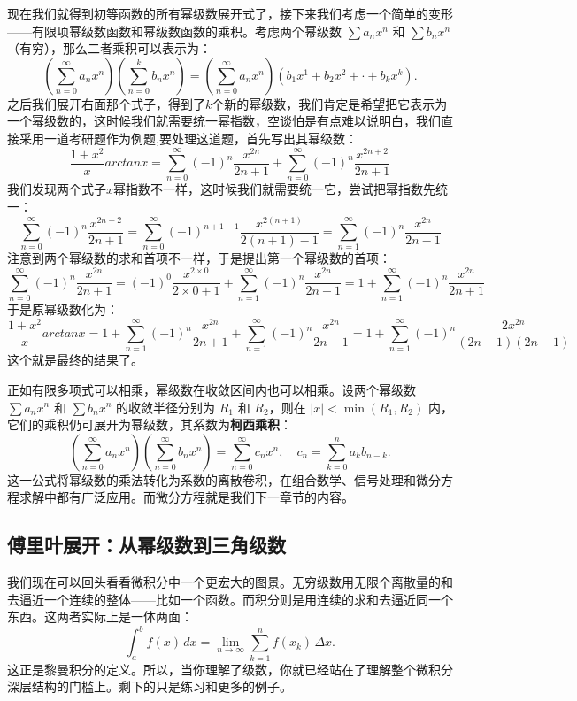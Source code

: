 \documentclass[UTF8]{ctexbook}
\begin{document}
现在我们就得到初等函数的所有幂级数展开式了，接下来我们考虑一个简单的变形——有限项幂级数函数和幂级数函数的乘积。考虑两个幂级数 $\sum a_n x^n$ 和 $\sum b_n x^n$（有穷），那么二者乘积可以表示为：
\[
\left( \sum_{n=0}^{\infty} a_n x^n \right) \left( \sum_{n=0}^{k} b_n x^n \right) = \left( \sum_{n=0}^{\infty} a_n x^n \right) \left( b_1x^1+b_2x^2+\cdot+b_kx^k \right).
\]
之后我们展开右面那个式子，得到了$k$个新的幂级数，我们肯定是希望把它表示为一个幂级数的，这时候我们就需要统一幂指数，空谈怕是有点难以说明白，我们直接采用一道考研题作为例题,要处理这道题，首先写出其幂级数：
\[
\frac{1+x^2}{x}arctanx=\sum_{n=0}^{\infty} (-1)^n \frac{x^{2n}}{2n+1} + \sum_{n=0}^{\infty} (-1)^n \frac{x^{2n+2}}{2n+1}
\]
我们发现两个式子$x$幂指数不一样，这时候我们就需要统一它，尝试把幂指数先统一：
\[
 \sum_{n=0}^{\infty} (-1)^n \frac{x^{2n+2}}{2n+1}= \sum_{n=0}^{\infty} (-1)^{n+1-1} \frac{x^{2(n+1)}}{2(n+1)-1}= \sum_{n=1}^{\infty} (-1)^n \frac{x^{2n}}{2n-1}
\]
注意到两个幂级数的求和首项不一样，于是提出第一个幂级数的首项：
\[
\sum_{n=0}^{\infty} (-1)^n \frac{x^{2n}}{2n+1} = (-1)^0 \frac{x^{2\times 0}}{2\times 0+1} + \sum_{n=1}^{\infty} (-1)^n \frac{x^{2n}}{2n+1} =1+\sum_{n=1}^{\infty} (-1)^n \frac{x^{2n}}{2n+1}
\]
于是原幂级数化为：
\[
\frac{1+x^2}{x}arctanx=1+\sum_{n=1}^{\infty} (-1)^n \frac{x^{2n}}{2n+1} + \sum_{n=1}^{\infty} (-1)^n \frac{x^{2n}}{2n-1}=1+\sum_{n=1}^{\infty} (-1)^n \frac{2x^{2n}}{(2n+1)(2n-1)}
\]
这个就是最终的结果了。

正如有限多项式可以相乘，幂级数在收敛区间内也可以相乘。设两个幂级数 $\sum a_n x^n$ 和 $\sum b_n x^n$ 的收敛半径分别为 $R_1$ 和 $R_2$，则在 $|x| < \min(R_1, R_2)$ 内，它们的乘积仍可展开为幂级数，其系数为\textbf{柯西乘积}：
\[
\left( \sum_{n=0}^{\infty} a_n x^n \right) \left( \sum_{n=0}^{\infty} b_n x^n \right) = \sum_{n=0}^{\infty} c_n x^n, \quad 
c_n = \sum_{k=0}^{n} a_k b_{n-k}.
\]
这一公式将幂级数的乘法转化为系数的离散卷积，在组合数学、信号处理和微分方程求解中都有广泛应用。而微分方程就是我们下一章节的内容。



\subsection{傅里叶展开：从幂级数到三角级数}


我们现在可以回头看看微积分中一个更宏大的图景。无穷级数用无限个离散量的和去逼近一个连续的整体——比如一个函数。而积分则是用连续的求和去逼近同一个东西。这两者实际上是一体两面：
\[
\int_a^b f(x)\,dx = \lim_{n\to\infty} \sum_{k=1}^n f(x_k)\,\Delta x.
\]
这正是黎曼积分的定义。所以，当你理解了级数，你就已经站在了理解整个微积分深层结构的门槛上。剩下的只是练习和更多的例子。
\end{document}
